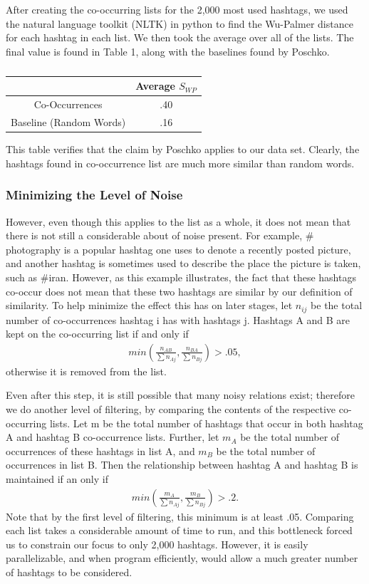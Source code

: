 After creating the co-occurring lists for the 2,000 most used hashtags, we used the natural language toolkit (NLTK) in python to find the Wu-Palmer distance for each hashtag in each list. We then took the average over all of the lists. The final value is found in Table 1, along with the baselines found by Poschko.
\begin{table}[ht]
\caption{}
\centering
\begin{tabular}{c c}
\hline\hline
& Average $S_{WP}$ \\ [0.5ex] %
\hline
Co-Occurrences & .40 \\
Baseline (Random Words) & .16 \\[1ex]
\hline
\end{tabular}
\label{table:nonlin}
\end{table}
This table verifies that the claim by Poschko applies to our data set. Clearly, the hashtags found in co-occurrence list are much more similar than random words.
    
\subsubsection{Minimizing the Level of Noise}
However, even though this applies to the list as a whole, it does not mean that there is not still a considerable about of noise present. For example, $\#$photography is a popular hashtag one uses to denote a recently posted picture, and another hashtag is sometimes used to describe the place the picture is taken, such as $\#$iran. However, as this example illustrates, the fact that these hashtags co-occur does not mean that these two hashtags are similar by our definition of similarity. To help minimize the effect this has on later stages, let $n_{ij}$ be the total number of co-occurrences hashtag i has with hashtags j. Hashtags A and B are kept on the co-occurring list if and only if
\begin{eqnarray}
min (\frac{n_{AB}}{ \sum n_{Aj}}, \frac{n_{BA}} {\sum n_{Bj}}) > .05, \nonumber
\end{eqnarray}
otherwise it is removed from the list.

Even after this step, it is still possible that many noisy relations exist; therefore we do another level of filtering, by comparing the contents of the respective co-occurring lists. Let m be the total number of hashtags that occur in both hashtag A and hashtag B co-occurrence lists. Further, let $m_A$ be the total number of occurrences of these hashtags in list A, and $m_B$ be the total number of occurrences in list B. Then the relationship between hashtag A and hashtag B is maintained if an only if
\begin{eqnarray}
min (\frac{{m_A} }{\sum n_{Aj}}, \frac{m_B }{ \sum n_{Bj}} ) > .2. \nonumber
\end{eqnarray}
Note that by the first level of filtering, this minimum is at least .05. Comparing each list takes a considerable amount of time to run, and this bottleneck forced us to constrain our focus to only 2,000 hashtags. However, it is easily parallelizable, and when program efficiently, would allow a much greater number of hashtags to be considered.

